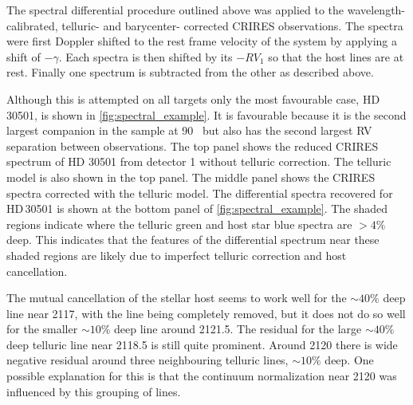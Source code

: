 The spectral differential procedure outlined above was applied to the wavelength-calibrated, telluric- and barycenter- corrected {CRIRES} observations.
The spectra were first Doppler shifted to the rest frame velocity of the system by applying a shift of \(-\gamma\).
Each spectra is then shifted by its $-{RV}_{1}$ so that the host lines are at rest.
Finally one spectrum is subtracted from the other as described above.

Although this is attempted on all targets only the most favourable case, {HD\,30501}, is shown in \cref{fig:spectral_example}.
It is favourable because it is the second largest companion in the sample at 90~\Mjup{} but also has the second largest {RV} separation between observations.
The top panel shows the reduced CRIRES spectrum of {HD 30501} from detector 1 without telluric correction.
The telluric model is also shown in the top panel.
The middle panel shows the CRIRES spectra corrected with the telluric model.
The differential spectra recovered for {HD\,30501} is shown at the bottom panel of \cref{fig:spectral_example}.
The shaded regions indicate where the telluric {green} and host star {blue} spectra are \(> 4\%\) deep.
This indicates that the features of the differential spectrum near these shaded regions are likely due to imperfect telluric correction and host cancellation.

The mutual cancellation of the stellar host seems to work well for the \(\sim40\%\) deep line near 2117\nm{}, with the line being completely removed, but it does not do so well for the smaller \(\sim10\%\) deep line around 2121.5\nm{}.
The residual for the large \(\sim40\%\) deep telluric line near 2118.5\nm{} is still quite prominent.
Around 2120\nm{} there is wide negative residual around three neighbouring telluric lines, \(\sim10\%\) deep.
One possible explanation for this is that the continuum normalization near 2120\nm{} was influenced by this grouping of lines.

